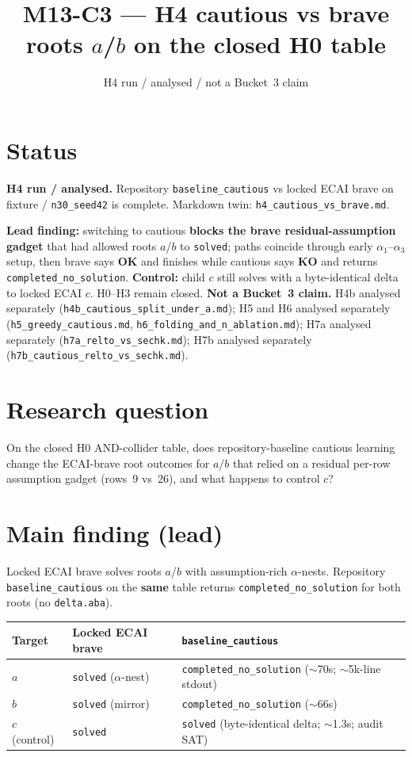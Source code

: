 \documentclass[11pt]{article}
\title{M13-C3 --- H4 cautious vs brave\\
roots \(a\)/\(b\) on the closed H0 table}
\author{}
\date{H4 run / analysed / not a Bucket~3 claim}
\begin{document}
\maketitle

\section{Status}

\textbf{H4 run / analysed.}
Repository \texttt{baseline\_cautious} vs locked ECAI brave on fixture
 / \texttt{n30\_seed42} is complete.
Markdown twin: \texttt{h4\_cautious\_vs\_brave.md}.

\textbf{Lead finding:} switching to cautious \textbf{blocks the brave
residual-assumption gadget} that had allowed roots \(a\)/\(b\) to
\texttt{solved}; paths coincide through early \(\alpha_1\)--\(\alpha_3\)
setup, then brave says \textbf{OK} and finishes while cautious says
\textbf{KO} and returns \texttt{completed\_no\_solution}.
\textbf{Control:} child \(c\) still solves with a byte-identical delta to
locked ECAI \(c\).
H0--H3 remain closed.
\textbf{Not a Bucket~3 claim.}
H4b analysed separately (\texttt{h4b\_cautious\_split\_under\_a.md});
H5 and H6 analysed separately (\texttt{h5\_greedy\_cautious.md},
\texttt{h6\_folding\_and\_n\_ablation.md}); H7a analysed separately
(\texttt{h7a\_relto\_vs\_sechk.md}); H7b analysed separately
(\texttt{h7b\_cautious\_relto\_vs\_sechk.md}).

\section{Research question}

On the closed H0 AND-collider table, does repository-baseline cautious
learning change the ECAI-brave root outcomes for \(a\)/\(b\) that relied on a
residual per-row assumption gadget (rows~9 vs~26), and what happens to
control \(c\)?

\section{Main finding (lead)}

Locked ECAI brave solves roots \(a\)/\(b\) with assumption-rich
\(\alpha\)-nests.
Repository \texttt{baseline\_cautious} on the \textbf{same} table returns
\texttt{completed\_no\_solution} for both roots (no \texttt{delta.aba}).

\begin{center}
\begin{tabular}{@{}lL{0.38\textwidth}L{0.42\textwidth}@{}}
\toprule
Target & Locked ECAI brave & \texttt{baseline\_cautious} \\
\midrule
\(a\) & \texttt{solved} (\(\alpha\)-nest) &
  \texttt{completed\_no\_solution} ($\sim$70s; $\sim$5k-line stdout) \\
\(b\) & \texttt{solved} (mirror) &
  \texttt{completed\_no\_solution} ($\sim$66s) \\
\(c\) (control) & \texttt{solved} &
  \texttt{solved} (byte-identical delta; $\sim$1.3s; audit SAT) \\
\bottomrule
\end{tabular}
\end{center}
\end{document}
